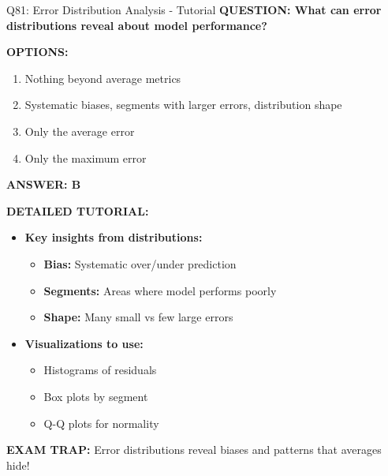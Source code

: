 \documentclass[8pt]{beamer}
\begin{document}
\begin{frame}{Q81: Error Distribution Analysis - Tutorial}
	\fontsize{6.5}{7.5}\selectfont
	\textbf{QUESTION: What can error distributions reveal about model performance?}
	
	\vspace{0.1cm}
	\textbf{OPTIONS:}
	\begin{enumerate}
		\item Nothing beyond average metrics
		\item Systematic biases, segments with larger errors, distribution shape
		\item Only the average error
		\item Only the maximum error
	\end{enumerate}
	
	\vspace{0.1cm}
	\textcolor{myblue}{\textbf{ANSWER: B}}
	
	\vspace{0.1cm}
	\textbf{DETAILED TUTORIAL:}
	\begin{itemize}
		\item \textbf{Key insights from distributions:}
		\begin{itemize}
			\item \textbf{Bias:} Systematic over/under prediction
			\item \textbf{Segments:} Areas where model performs poorly
			\item \textbf{Shape:} Many small vs few large errors
		\end{itemize}
		\item \textbf{Visualizations to use:}
		\begin{itemize}
			\item Histograms of residuals
			\item Box plots by segment
			\item Q-Q plots for normality
		\end{itemize}
	\end{itemize}
	
	\textcolor{myred}{\textbf{EXAM TRAP:}} Error distributions reveal \textcolor{myblue}{biases and patterns} that averages hide!
\end{frame}
\end{document}
